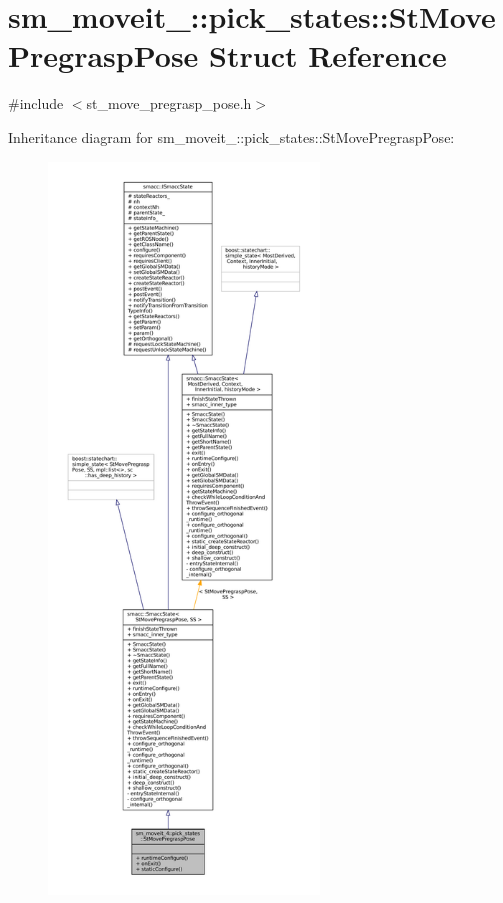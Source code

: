 \hypertarget{structsm__moveit__4_1_1pick__states_1_1StMovePregraspPose}{}\section{sm\+\_\+moveit\+\_\+:\+:pick\+\_\+states\+:\+:St\+Move\+Pregrasp\+Pose Struct Reference}
\label{structsm__moveit__4_1_1pick__states_1_1StMovePregraspPose}


{\ttfamily \#include $<$st\+\_\+move\+\_\+pregrasp\+\_\+pose.\+h$>$}



Inheritance diagram for sm\+\_\+moveit\+\_\+:\+:pick\+\_\+states\+:\+:St\+Move\+Pregrasp\+Pose\+:
\nopagebreak
\begin{figure}[H]
\begin{center}
\leavevmode
\includegraphics[height=550pt]{structsm__moveit__4_1_1pick__states_1_1StMovePregraspPose__inherit__graph}
\end{center}
\end{figure}


